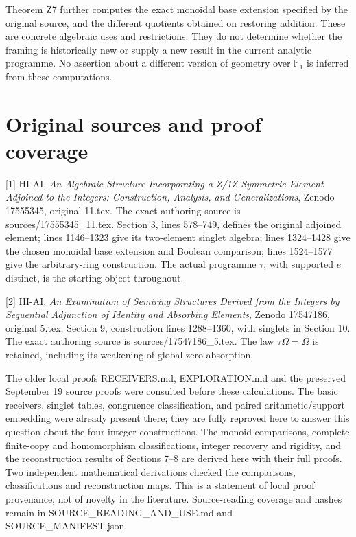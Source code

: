 \documentclass[
]{article}
\begin{document}
Theorem Z7 further computes the exact monoidal base extension specified
by the original source, and the different quotients obtained on
restoring addition. These are concrete algebraic uses and restrictions.
They do not determine whether the framing is historically new or supply
a new result in the current analytic programme. No assertion about a
different version of geometry over \(\mathbb F_1\) is inferred from
these computations.

\section{Original sources and proof
coverage}\label{original-sources-and-proof-coverage}

{[}1{]} HI-AI, \emph{An Algebraic Structure Incorporating a
Z/1Z-Symmetric Element Adjoined to the Integers: Construction, Analysis,
and Generalizations}, Zenodo 17555345, original 11.tex. The exact
authoring source is sources/17555345\_11.tex. Section 3, lines 578--749,
defines the original adjoined element; lines 1146--1323 give its
two-element singlet algebra; lines 1324--1428 give the chosen monoidal
base extension and Boolean comparison; lines 1524--1577 give the
arbitrary-ring construction. The actual programme \(\tau\), with
supported \(e\) distinct, is the starting object throughout.

{[}2{]} HI-AI, \emph{An Examination of Semiring Structures Derived from
the Integers by Sequential Adjunction of Identity and Absorbing
Elements}, Zenodo 17547186, original 5.tex, Section 9, construction
lines 1288--1360, with singlets in Section 10. The exact authoring
source is sources/17547186\_5.tex. The law \(\tau\Omega=\Omega\) is
retained, including its weakening of global zero absorption.

The older local proofs RECEIVERS.md, EXPLORATION.md and the preserved
September 19 source proofs were consulted before these calculations. The
basic receivers, singlet tables, congruence classification, and paired
arithmetic/support embedding were already present there; they are fully
reproved here to answer this question about the four integer
constructions. The monoid comparisons, complete finite-copy and
homomorphism classifications, integer recovery and rigidity, and the
reconstruction results of Sections 7--8 are derived here with their full
proofs. Two independent mathematical derivations checked the
comparisons, classifications and reconstruction maps. This is a
statement of local proof provenance, not of novelty in the literature.
Source-reading coverage and hashes remain in
SOURCE\_READING\_AND\_USE.md and SOURCE\_MANIFEST.json.
\end{document}
